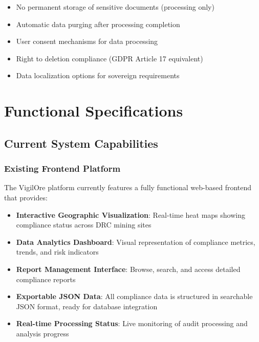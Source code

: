 \documentclass[11pt,a4paper]{article}
\begin{document}
\begin{keypoint}
\begin{itemize}
    \item No permanent storage of sensitive documents (processing only)
    \item Automatic data purging after processing completion
    \item User consent mechanisms for data processing
    \item Right to deletion compliance (GDPR Article 17 equivalent)
    \item Data localization options for sovereign requirements
\end{itemize}
\end{keypoint}

\section{Functional Specifications}

\subsection{Current System Capabilities}

\subsubsection{Existing Frontend Platform}

\begin{keypoint}
The VigilOre platform currently features a fully functional web-based frontend that provides:
\begin{itemize}
    \item \textbf{Interactive Geographic Visualization}: Real-time heat maps showing compliance status across DRC mining sites
    \item \textbf{Data Analytics Dashboard}: Visual representation of compliance metrics, trends, and risk indicators
    \item \textbf{Report Management Interface}: Browse, search, and access detailed compliance reports
    \item \textbf{Exportable JSON Data}: All compliance data is structured in searchable JSON format, ready for database integration
    \item \textbf{Real-time Processing Status}: Live monitoring of audit processing and analysis progress
\end{itemize}
\end{keypoint}
\end{document}
